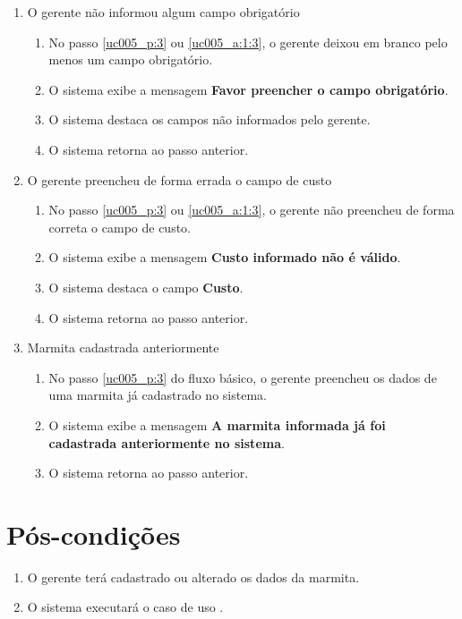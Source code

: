 \begin{enumerate}[label=E\arabic*]	
	\item O gerente não informou algum campo obrigatório \label{uc005_e:1}
	\begin{enumerate}[label*=.\arabic*]
		\item[] No passo \ref{uc005_p:3} ou \ref{uc005_a:1:3}, o gerente deixou em branco pelo menos um campo obrigatório.
		\item O sistema exibe a mensagem \textbf{Favor preencher o campo obrigatório}.
		\item O sistema destaca os campos não informados pelo gerente.
		\item O sistema retorna ao passo anterior.
	\end{enumerate}
	
	\item O gerente preencheu de forma errada o campo de custo \label{uc005_e:2}
	\begin{enumerate}[label*=.\arabic*]		
		\item[] No passo \ref{uc005_p:3} ou \ref{uc005_a:1:3}, o gerente não preencheu de forma correta o campo de custo.		
		\item O sistema exibe a mensagem \textbf{Custo informado não é válido}.
		\item O sistema destaca o campo \textbf{Custo}.
		\item O sistema retorna ao passo anterior.
	\end{enumerate}
		
	\item Marmita cadastrada anteriormente \label{uc005_e:3}
	\begin{enumerate}[label*=.\arabic*]
		\item[] No passo \ref{uc005_p:3} do fluxo básico, o gerente preencheu os dados de uma marmita já cadastrado no sistema.
		\item O sistema exibe a mensagem \textbf{A marmita informada já foi cadastrada anteriormente no sistema}.
		\item O sistema retorna ao passo anterior.
	\end{enumerate}
\end{enumerate}

\section{Pós-condições}

\begin{enumerate}
	\item O gerente terá cadastrado ou alterado os dados da marmita.
	\item O sistema executará o caso de uso .	
\end{enumerate}

